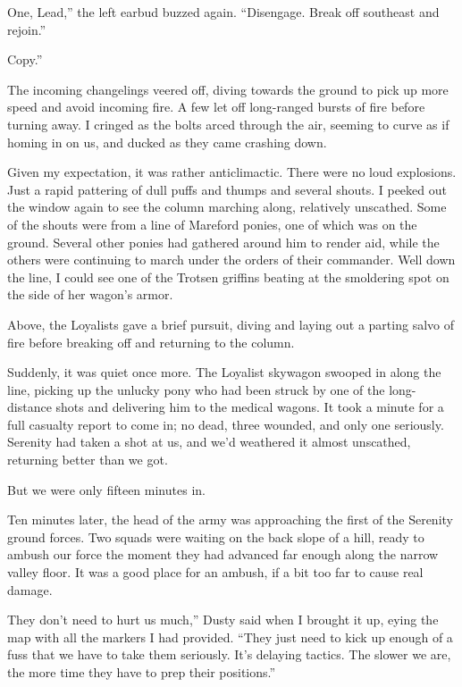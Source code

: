 \leavevmode{}One, Lead,” the left earbud buzzed again. “Disengage. Break off southeast and rejoin.”

\leavevmode{}Copy.”

The incoming changelings veered off, diving towards the ground to pick up more speed and avoid incoming fire. A few let off long-ranged bursts of fire before turning away. I cringed as the bolts arced through the air, seeming to curve as if homing in on us, and ducked as they came crashing down.

Given my expectation, it was rather anticlimactic. There were no loud explosions. Just a rapid pattering of dull puffs and thumps and several shouts. I peeked out the window again to see the column marching along, relatively unscathed. Some of the shouts were from a line of Mareford ponies, one of which was on the ground. Several other ponies had gathered around him to render aid, while the others were continuing to march under the orders of their commander. Well down the line, I could see one of the Trotsen griffins beating at the smoldering spot on the side of her wagon’s armor.

Above, the Loyalists gave a brief pursuit, diving and laying out a parting salvo of fire before breaking off and returning to the column.

Suddenly, it was quiet once more. The Loyalist skywagon swooped in along the line, picking up the unlucky pony who had been struck by one of the long-distance shots and delivering him to the medical wagons. It took a minute for a full casualty report to come in; no dead, three wounded, and only one seriously. Serenity had taken a shot at us, and we’d weathered it almost unscathed, returning better than we got.

But we were only fifteen minutes in.

Ten minutes later, the head of the army was approaching the first of the Serenity ground forces. Two squads were waiting on the back slope of a hill, ready to ambush our force the moment they had advanced far enough along the narrow valley floor. It was a good place for an ambush, if a bit too far to cause real damage.

\leavevmode{}They don’t need to hurt us much,” Dusty said when I brought it up, eying the map with all the markers I had provided. “They just need to kick up enough of a fuss that we have to take them seriously. It’s delaying tactics. The slower we are, the more time they have to prep their positions.”

